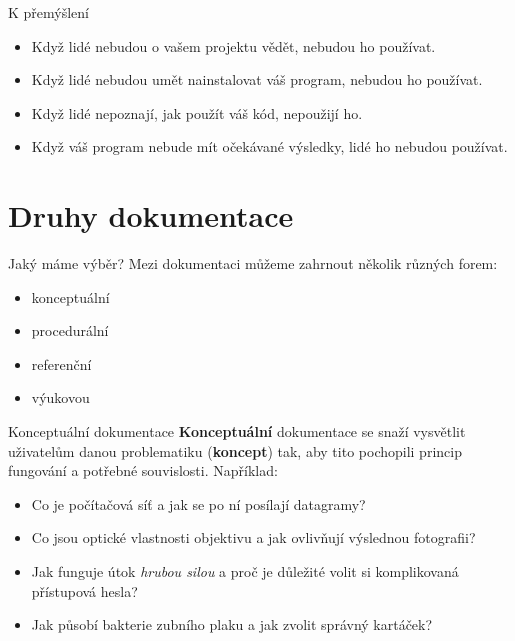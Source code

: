 \documentclass[12pt]{beamer}
\begin{document}
		\begin{frame}{K přemýšlení}
			\begin{itemize}
			\item Když lidé nebudou o vašem projektu vědět, nebudou ho používat.
			\item Když lidé nebudou umět nainstalovat váš program, nebudou ho používat.
			\item Když lidé nepoznají, jak použít váš kód, nepoužijí ho.
			\item Když váš program nebude mít očekávané výsledky, lidé ho nebudou používat.
			\end{itemize}
		\end{frame}
	
    
    \section{Druhy dokumentace}
    
    	\begin{frame}{Jaký máme výběr?}
    	Mezi dokumentaci můžeme zahrnout několik různých forem:
    	\begin{itemize}
    		\item konceptuální 
    		\item procedurální 
    		\item referenční
    		\item výukovou
    	\end{itemize}
		\end{frame}
	
		\begin{frame}{Konceptuální dokumentace}
		\textbf{Konceptuální} dokumentace se snaží vysvětlit uživatelům danou problematiku (\textbf{koncept}) tak, aby tito pochopili princip fungování a potřebné souvislosti. Například:
		
		\begin{itemize}
			\item Co je počítačová síť a jak se po ní posílají datagramy?
			\item Co jsou optické vlastnosti objektivu a jak ovlivňují výslednou fotografii?
			\item Jak funguje útok \textit{hrubou silou} a proč je důležité volit si komplikovaná přístupová hesla?
			\item Jak působí bakterie zubního plaku a jak zvolit správný kartáček?
		\end{itemize}
		\end{frame}
	
\end{document}
